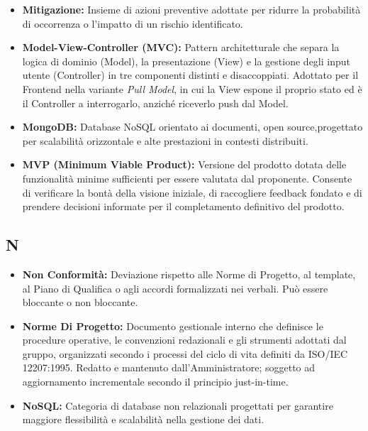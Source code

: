 \begin{itemize}[leftmargin=*]
          registrati nel foglio di calcolo condiviso e utilizzati per il
          monitoraggio dell'avanzamento.
      \item \textbf{Mitigazione:} Insieme di azioni preventive adottate per ridurre la probabilità di occorrenza o l'impatto di un rischio identificato.
      \item \textbf{Model-View-Controller (MVC):} Pattern architetturale che separa la logica di dominio (Model), la presentazione (View) e la gestione degli input utente (Controller) in tre componenti distinti e disaccoppiati. Adottato per il Frontend nella variante \textit{Pull Model}, in cui la View espone il proprio stato ed è il Controller a interrogarlo, anziché riceverlo push dal Model.
      \item \textbf{MongoDB:} Database NoSQL orientato ai documenti, open source,progettato per scalabilità orizzontale e alte prestazioni in contesti distribuiti.
      \item \textbf{MVP (Minimum Viable Product):} Versione del prodotto dotata delle
          funzionalità minime sufficienti per essere valutata dal proponente.
          Consente di verificare la bontà della visione iniziale, di raccogliere
          feedback fondato e di prendere decisioni informate per il completamento
          definitivo del prodotto.
\end{itemize}
 
{}
\subsection*{N}
\begin{itemize}[leftmargin=*]
      \item \textbf{Non Conformità:} Deviazione rispetto alle Norme di Progetto, al template, al Piano di Qualifica o agli accordi formalizzati nei verbali. Può essere bloccante o non bloccante.
      \item \textbf{Norme Di Progetto:} Documento gestionale interno che definisce
          le procedure operative, le convenzioni redazionali e gli strumenti adottati
          dal gruppo, organizzati secondo i processi del ciclo di vita definiti da
          ISO/IEC 12207:1995. Redatto e mantenuto dall'Amministratore; soggetto
          ad aggiornamento incrementale secondo il principio just-in-time.
      \item \textbf{NoSQL:} Categoria di database non relazionali progettati per garantire maggiore flessibilità e scalabilità nella gestione dei dati.
\end{itemize}
 
